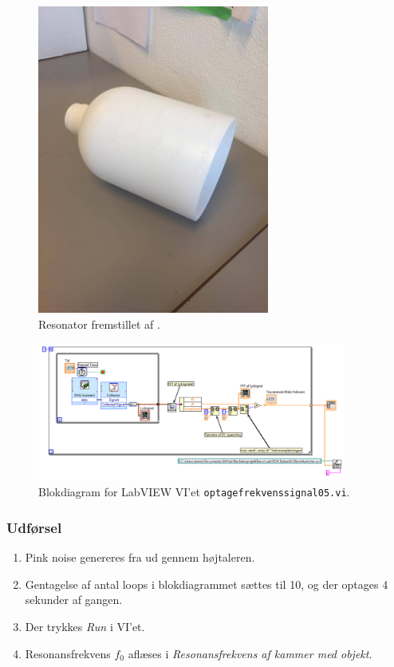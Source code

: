 	\begin{figure}[htb]
	\centering
	\includegraphics[width=3in]{resonator.jpg}
	\caption{Resonator fremstillet af .}
	\label{fig:resonator}	
	\end{figure}

	\begin{figure}[htb]
	\centering
	\includegraphics[width=4in]{optagefrekvenssignal05.png}
	\caption{Blokdiagram for LabVIEW VI'et \texttt{optagefrekvenssignal05.vi}.}
	\label{fig:optagefrekvenssignal05}	
	\end{figure}
	
	\subsubsection{Udførsel}
			
			\begin{enumerate}
			\item Pink noise genereres fra \onlineg  ud gennem højtaleren. 
			\item Gentagelse af antal loops i blokdiagrammet sættes til 10, og der optages 4 sekunder af gangen. 
			\item Der trykkes \textit{Run} i VI'et. 
			\item Resonansfrekvens $f_{0}$ aflæses i \textit{Resonansfrekvens af kammer med objekt}.
			\end{enumerate}
			
